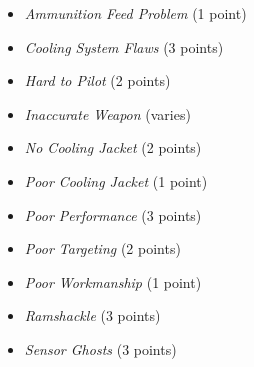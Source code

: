 
\begin{itemize}

\item \emph{Ammunition Feed Problem} (1 point)

\item \emph{Cooling System Flaws} (3 points)

\item \emph{Hard to Pilot} (2 points)

\item \emph{Inaccurate Weapon} (varies)

\item \emph{No Cooling Jacket} (2 points)

\item \emph{Poor Cooling Jacket} (1 point)

\item \emph{Poor Performance} (3 points)

\item \emph{Poor Targeting} (2 points)

\item \emph{Poor Workmanship} (1 point)

\item \emph{Ramshackle} (3 points)

\item \emph{Sensor Ghosts} (3 points)


\end{itemize}

